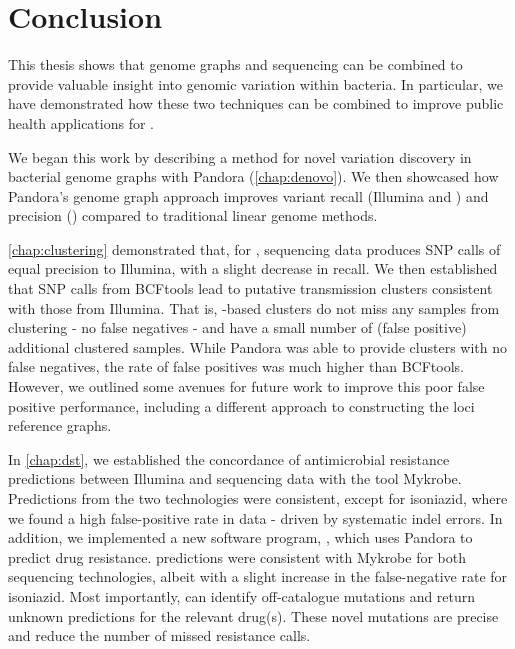 \chapter*{Conclusion}
 
\label{chap:conclusion}

This thesis shows that genome graphs and \ont{} sequencing can be combined to provide valuable insight into genomic variation within bacteria. In particular, we have demonstrated how these two techniques can be combined to improve public health applications for \mtb{}.

We began this work by describing a method for novel variation discovery in bacterial genome graphs with Pandora (\autoref{chap:denovo}). We then showcased how Pandora's genome graph approach improves variant recall (Illumina and \ont{}) and precision (\ont{}) compared to traditional linear genome methods.

\autoref{chap:clustering} demonstrated that, for \mtb{}, \ont{} sequencing data produces SNP calls of equal precision to Illumina, with a slight decrease in recall. We then established that \ont{} SNP calls from BCFtools lead to putative transmission clusters consistent with those from Illumina. That is, \ont{}-based clusters do not miss any samples from clustering - no false negatives - and have a small number of (false positive) additional clustered samples. While Pandora was able to provide clusters with no false negatives, the rate of false positives was much higher than BCFtools. However, we outlined some avenues for future work to improve this poor false positive performance, including a different approach to constructing the loci reference graphs. 

In \autoref{chap:dst}, we established the concordance of antimicrobial resistance predictions between Illumina and \ont{} sequencing data with the tool Mykrobe. Predictions from the two technologies were consistent, except for isoniazid, where we found a high false-positive rate in \ont{} data - driven by systematic indel errors. In addition, we implemented a new software program, \drprg{}, which uses Pandora to predict drug resistance. \drprg{} predictions were consistent with Mykrobe for both sequencing technologies, albeit with a slight increase in the false-negative rate for isoniazid. Most importantly, \drprg{} can identify off-catalogue mutations and return unknown predictions for the relevant drug(s). These novel mutations are precise and reduce the number of missed resistance calls.

